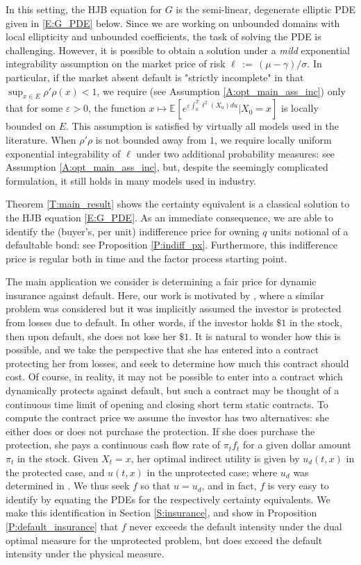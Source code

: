 \documentclass[11pt, letterpaper]{amsart}
\theoremstyle{definition}
\theoremstyle{remark}
\numberwithin{equation}{section}
\newcommand{\eps}{\varepsilon}
\newcommand{\esp}{\mathbb{E}}
\newcommand{\espalt}[2]{\esp^{#1}\bra{#2}}
\newcommand{\dfn}{\, := \,}
\newcommand{\bra}[1]{\left[#1\right]}
\begin{document}
In this setting, the HJB equation for $G$ is the semi-linear, degenerate elliptic PDE given in \eqref{E:G_PDE} below.  Since we are working on unbounded domains with local ellipticity and unbounded coefficients, the task of solving the PDE is challenging.   However, it is possible to obtain a solution under a \emph{mild} exponential integrability assumption on the market price of risk $\ell \dfn (\mu-\gamma)/\sigma$.  In particular, if the market absent default is "strictly incomplete" in that $\sup_{x\in E}\rho'\rho(x) < 1$, we require (see Assumption \ref{A:opt_main_ass_inc}) only that for some $\eps > 0$, the function $x\mapsto \espalt{}{e^{\eps\int_0^T \ell^2(X_u)du}\big| X_0 = x}$ is locally bounded on $E$.  This assumption is satisfied by virtually all models used in the literature.  When $\rho'\rho$ is not bounded away from $1$, we require locally uniform exponential integrability of $\ell$ under two additional probability measures: see Assumption \ref{A:opt_main_ass_inc}, but, despite the seemingly complicated formulation, it still holds in many models used in industry.

Theorem \ref{T:main_result} shows the certainty equivalent is a classical solution to the HJB equation \eqref{E:G_PDE}.  As an immediate consequence, we are able to identify the (buyer's, per unit) indifference price for owning $q$ units notional of a defaultable bond: see Proposition \ref{P:indiff_px}.  Furthermore, this indifference price is regular both in time and the factor process starting point.

The main application we consider is determining a fair price for dynamic insurance against default.  Here, our work is motivated by \cite{MR2359373}, where a similar problem was considered but it was implicitly assumed the investor is protected from losses due to default. In other words, if the investor holds $\$1$ in the stock, then upon default, she does not lose her $\$1$.  It is natural to wonder how this is possible, and we take the perspective that she has entered into a contract protecting her from losses, and seek to determine how much this contract should cost.  Of course, in reality, it may not be possible to enter into a contract which dynamically protects against default, but such a contract may be thought of a continuous time limit of opening and closing short term static contracts. To compute the contract price we assume the investor has two alternatives: she either does or does not purchase the protection. If she does purchase the protection, she pays a continuous cash flow rate of $\pi_t f_t$ for a given dollar amount $\pi_t$ in the stock.  Given $X_t = x$, her optimal indirect utility is given by $u_d(t,x)$ in the protected case, and $u(t,x)$ in the unprotected case; where $u_d$ was determined in \cite{MR2359373}.  We thus seek $f$ so that $u = u_d$, and in fact, $f$ is very easy to identify by equating the PDEs for the respectively certainty equivalents.  We make this identification in Section \ref{S:insurance}, and show in Proposition \ref{P:default_insurance} that $f$ never exceeds the default intensity under the dual optimal measure for the unprotected problem, but does exceed the default intensity under the physical measure.
\end{document}
